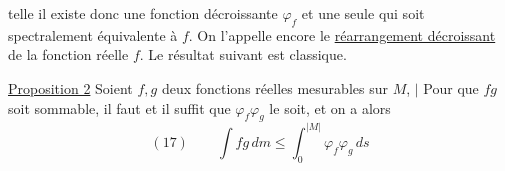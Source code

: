  telle  il existe donc une fonction décroissante \(\varphi_f\) et une seule \inserted{sur \(]0,|M|[\)} qui soit spectralement équivalente à \(f\). On l'appelle encore le \uline{réarrangement décroissant} de la fonction réelle \(f\). Le résultat suivant est classique.

\uline{Proposition 2} Soient \(f,g\) deux fonctions réelles mesurables sur \(M\),  \(\bigl|\) Pour que \(fg\) soit sommable, il faut et il suffit que \(\varphi_f\varphi_g\) le soit, et on a alors
\[
(17)\qquad\int fg\,dm\leq\int_0^{|M|}\varphi_f\varphi_g\,ds
\]


